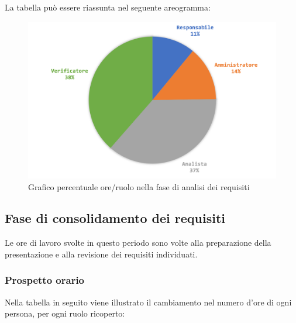 			La tabella può essere riassunta nel seguente areogramma:
			\begin{figure}[H]
				\centering
				\includegraphics[width=0.8\linewidth]{images/consuntivo/analisiCons2.png}
				\caption{Grafico percentuale ore/ruolo nella fase di analisi dei requisiti}
				\label{fig:consuntivo2 grafico costi ruolo fase analisi dei requisiti}
			\end{figure}
		
		

		\subsection{Fase di consolidamento dei requisiti}
		Le ore di lavoro svolte in questo periodo sono volte alla preparazione della presentazione e alla revisione dei requisiti individuati. 
		\subsubsection{Prospetto orario}
			Nella tabella in seguito viene illustrato il cambiamento nel numero d'ore di ogni persona, per ogni ruolo ricoperto:
			
